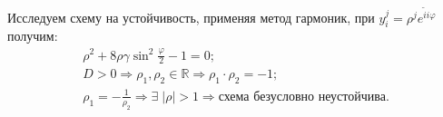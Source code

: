 \documentclass{article}
\begin{document}
\begin{enumerate}
		Исследуем схему на устойчивость, применяя метод гармоник, при 
		$y_i^j = \rho^j e^{\tilde{i} i \varphi}$ получим:
		\begin{gather*}
			\rho^2 + 8\rho\gamma \sin^2{\frac{\varphi}{2}} - 1 = 0;\\
			D>0 \Rightarrow \rho_1,\rho_2 \in \mathbb{R} \Rightarrow \rho_1 \cdot \rho_2 = -1;\\
			\rho_1=-\frac{1}{\rho_2} \Rightarrow \exists \; |\rho|>1 \Rightarrow \text{схема безусловно неустойчива}.
		\end{gather*}
	\end{enumerate}
\end{document}
